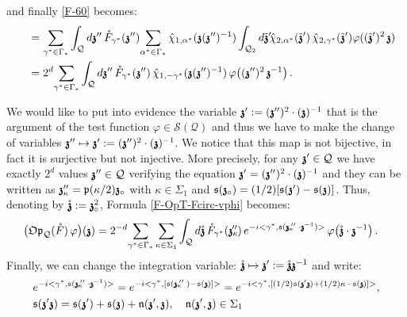 \documentclass[12pt]{article}
\theoremstyle{definition}
\def\Op{\mathfrak{Op}}
\def\T{\mathcal{Q}}
\def\p{\mathfrak{p}}
\def\s{\mathfrak{s}}
\def\bz{\mathfrak{z}\hspace*{-4pt}\mathfrak{z}}
\numberwithin{equation}{section}
\begin{document}
and finally \eqref{F-60} becomes:
\begin{align*}
&\quad=\underset{\gamma^*\in\Gamma_*}{\sum}\int_{\T}d\bz''\,\mathring{F}_{\gamma^*}(\bz'')\underset{\alpha^*\in\Gamma_*}{\sum}\,\hat{\chi}_{1,\alpha^*}(\bz(\bz'')^{-1})\int_{\T_2}d\tilde{\bz}'\hspace*{-2pt}\hat{\chi}_{2,\alpha^*}(\tilde{\bz}')\,\hat{\chi}_{2,\gamma^*}(\tilde{\bz}')\varphi((\tilde{\bz}')^2\,\bz)\\
&\quad=2^d\underset{\gamma^*\in\Gamma_*}{\sum}\int_{\T}d\bz''\,\mathring{F}_{\gamma^*}(\bz'')\,\hat{\chi}_{1,-\gamma^*}(\bz(\bz'')^{-1})\,\varphi\big((\bz^{\prime\prime})^2\,\bz^{-1}\big)\,.
\end{align*}


 We would like to put into evidence the variable $\bz':=(\bz'')^2\cdot(\bz)^{-1}$ that is the argument of the test function $\varphi\in\mathscr{S}(\T)$ and thus we have to make the change of variables $\bz''\mapsto\bz':=(\bz'')^2\cdot(\bz)^{-1}$. We notice that this map is not bijective, in fact it is surjective but not injective. More precisely, for any $\bz'\in\T$ we have exactly $2^d$ values $\bz''\in\T$ verifying the equation $\bz^\prime=(\bz'')^2\cdot(\bz)^{-1}$ and they can be written as $\bz^{\prime\prime}_\kappa=\p(\kappa/2)\bz_\circ$ with $\kappa\in\Sigma_1$ and $\s(\bz_\circ)=(1/2)[\s(\bz^\prime)-\s(\bz)]$. Thus, denoting by $\mathring{\bz}:=\bz_\circ^2$, Formula \eqref{F-OpT-Fcirc-vphi} becomes:
\begin{align}
	&\big(\Op_{\T}(\mathring{F})\,\varphi\big)(\bz)=2^{-d}\underset{\gamma^*\in\Gamma_{*}}{\sum}\,\underset{\kappa\in\Sigma_1}{\sum}\int_{\T}d\mathring{\bz}\,\mathring{F}_{\gamma^*}(\bz_\kappa\hspace*{-6pt}'')\,e^{-i<\gamma^*,\s(\bz_\kappa\hspace*{-3pt}''\hspace*{2pt}\cdot\bz^{-1})>}\,\varphi\big(\mathring{\bz}\cdot\bz^{-1}\big)\,.
\end{align}
Finally, we can change the integration variable: $\mathring{\bz}\mapsto\bz^\prime:=\mathring{\bz}\bz^{-1}$ and write:
\begin{align}
&e^{-i<\gamma^*,\s(\bz_\kappa\hspace*{-3pt}''\hspace*{2pt}\cdot\bz^{-1})>}=e^{-i<\gamma^*,[\s(\bz_\kappa\hspace*{-3pt}''\hspace*{2pt})-\s(\bz)]>}=e^{-i<\gamma^*,[(1/2)\s(\bz^\prime\bz)+(1/2)\kappa-\s(\bz)]>},\\ \nonumber
&\s(\bz^\prime\bz)=\s(\bz^\prime)+\s(\bz)+\mathfrak{n}(\bz^\prime,\bz),\quad\mathfrak{n}(\bz^\prime,\bz)\in\Sigma_1
\end{align}
\end{document}
